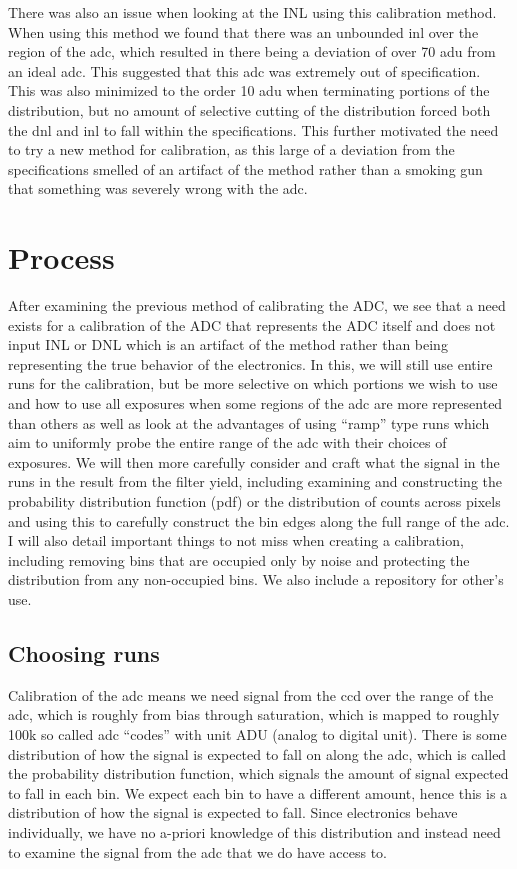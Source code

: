 \documentclass[11pt, letterpaper]{article}
\begin{document}
There was also an issue when looking at the INL using this calibration method. When using this method we found that there was an unbounded inl over the region of the adc, which resulted in there being a deviation of over 70 adu from an ideal adc. This suggested that this adc was extremely out of specification. This was also minimized to the order 10 adu when terminating portions of the distribution, but no amount of selective cutting of the distribution forced both the dnl and inl to fall within the specifications. This further motivated the need to try a new method for calibration, as this large of a deviation from the specifications smelled of an artifact of the method rather than a smoking gun that something was severely wrong with the adc. 

\section{Process}
After examining the previous method of calibrating the ADC, we see that a need exists for a calibration of the ADC that represents the ADC itself and does not input INL or DNL which is an artifact of the method rather than being representing the true behavior of the electronics. In this, we will still use entire runs for the calibration, but be more selective on which portions we wish to use and how to use all exposures when some regions of the adc are more represented than others as well as look at the advantages of using “ramp” type runs which aim to uniformly probe the entire range of the adc with their choices of exposures. We will then more carefully consider and craft what the signal in the runs in the result from the filter yield, including examining and constructing the probability distribution function (pdf) or the distribution of counts across pixels and using this to carefully construct the bin edges along the full range of the adc. I will also detail important things to not miss when creating a calibration, including removing bins that are occupied only by noise and protecting the distribution from any non-occupied bins. We also include a repository for other’s use. 

\subsection{Choosing runs}
Calibration of the adc means we need signal from the ccd over the range of the adc, which is roughly from bias through saturation, which is mapped to roughly 100k so called adc “codes” with unit ADU (analog to digital unit). There is some distribution of how the signal is expected to fall on along the adc, which is called the probability distribution function, which signals the amount of signal expected to fall in each bin. We expect each bin to have a different amount, hence this is a distribution of how the signal is expected to fall. Since electronics behave individually, we have no a-priori knowledge of this distribution and instead need to examine the signal from the adc that we do have access to. 
\end{document}
